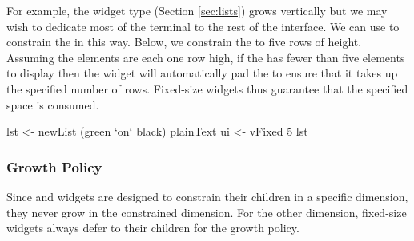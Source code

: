 For example, the  widget type (Section \ref{sec:lists}) grows
vertically but we may wish to dedicate most of the terminal to the
rest of the interface.  We can use  to constrain the
 in this way.  Below, we constrain the  to five rows
of height.  Assuming the  elements are each one row high, if
the  has fewer than five elements to display then the
 widget will automatically pad the  to ensure that
it takes up the specified number of rows.  Fixed-size widgets thus
guarantee that the specified space is consumed.

\begin{haskellcode}
 lst <- newList (green `on` black) plainText
 ui <- vFixed 5 lst
\end{haskellcode}

\subsubsection{Growth Policy}

Since  and  widgets are designed to constrain
their children in a specific dimension, they never grow in the
constrained dimension.  For the other dimension, fixed-size widgets
always defer to their children for the growth policy.
